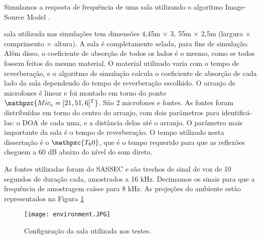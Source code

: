 \label{app:A}

Simulamos a resposta de frequência de uma sala utilizando o algoritmo Image-Source Model \cite{simulation}.

sala utilizada nas simulações tem dimensões 4,45m × 3, 55m × 2,5m (largura × comprimento × altura). A sala é completamente selada, para fins de simulação. Além disso, o coeficiente de absorção de todos os lados é o mesmo, como se todos fossem feitos do mesmo material. O material utilizado varia com o tempo de reverberação, e o algoritmo de simulação calcula o coeficiente de absorção de cada lado da sala dependendo do
tempo de reverberação escolhido. O arranjo de microfones é linear e foi montado em torno do ponto $\mathpzc{Mic_c = [2 1,5 1,6]^T}$. São 2 microfones e fontes. As fontes foram distribuídas em torno do centro do arranjo, com dois parâmetros para identificá-las: o DOA de cada uma, e a distância delas até o arranjo. O parâmetro mais importante da sala é o tempo de reverberação. O tempo utilizado nesta dissertação é o $\mathpzc{T_60}$, que é o tempo requerido para que as reflexões cheguem a 60 dB abaixo do nível do som direto.

As fontes utilizadas foram do SASSEC e são trechos de sinal de voz de 10 segundos de duração cada, amostrados a 16 kHz. Decimamos os sinais para que a frequência de amostragem caísse para 8 kHz. As projeções do ambiente estão representados na Figura \ref{fig:environment}

\begin{figure}
    \centering
    \texttt{[image: environment.JPG]}
    \caption{Configuração da sala utilizada nos testes.}
    \label{fig:environment}
\end{figure}
